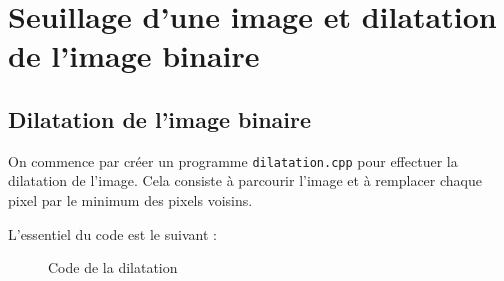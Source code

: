 \documentclass[french,a4paper,10pt]{article}
\begin{document}
	\newpage
	\section{Seuillage d'une image et dilatation de l'image binaire}\label{sec:2}

	\subsection{Dilatation de l'image binaire}\label{subsec:2.1}

	On commence par créer un programme \texttt{dilatation.cpp} pour effectuer la dilatation de l'image.
	Cela consiste à parcourir l'image et à remplacer chaque pixel par le minimum des pixels voisins.

	L'essentiel du code est le suivant : %
	\begin{figure}[!htb]
		\centering
		\caption{Code de la dilatation}\label{Fig:dilatation-code}
	\end{figure}
\end{document}
